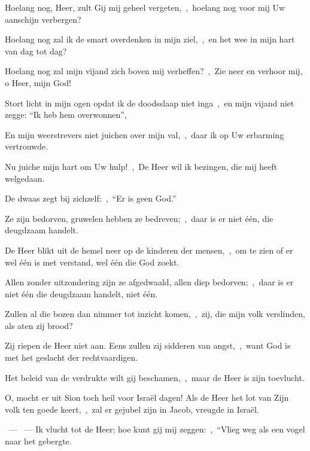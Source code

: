 \documentclass[12pt,twoside,a5paper]{article}
\begin{document}
\begin{halfparskip}
   Hoelang nog, Heer, zult Gij mij geheel vergeten,~\sep\ hoelang nog voor mij Uw aanschijn verbergen?

  Hoelang nog zal ik de smart overdenken in mijn ziel,~\sep\ en het wee in mijn hart van dag tot dag?

  Hoelang nog zal mijn vijand zich boven mij verheffen?~\sep\ Zie neer en verhoor mij, o Heer, mijn God!

  Stort licht in mijn ogen opdat ik de doodsslaap niet inga~\sep\ en mijn vijand niet zegge: ``Ik heb hem overwonnen'',

  En mijn weerstrevers niet juichen over mijn val,~\sep\ daar ik op Uw erbarming vertrouwde.

  Nu juiche mijn hart om Uw hulp!~\sep\ De Heer wil ik bezingen, die mij heeft welgedaan.
\end{halfparskip}

\begin{halfparskip}
   De dwaas zegt bij zichzelf:~\sep\ ``Er is geen God.''

  Ze zijn bedorven, gruwelen hebben ze bedreven;~\sep\ daar is er niet één, die deugdzaam handelt.

  De Heer blikt uit de hemel neer op de kinderen der mensen,~\sep\ om te zien of er wel één is met verstand, wel één die God zoekt.

  Allen zonder uitzondering zijn ze afgedwaald, allen diep bedorven;~\sep\ daar is er niet één die deugdzaam handelt, niet één.

  Zullen al die bozen dan nimmer tot inzicht komen,~\sep\ zij, die mijn volk verslinden, als aten zij brood?

  Zij riepen de Heer niet aan. Eens zullen zij sidderen van angst,~\sep\ want God is met het geslacht der rechtvaardigen.

  Het beleid van de verdrukte wilt gij beschamen,~\sep\ maar de Heer is zijn toevlucht.

  O, mocht er uit Sion toch heil voor Israël dagen! Als de Heer het lot van Zijn volk ten goede keert,~\sep\ zal er gejubel zijn in Jacob, vreugde in Israël.
\end{halfparskip}

\begin{halfparskip}
  ~--- ~---  Ik vlucht tot de Heer; hoe kunt gij mij zeggen:~\sep\ ``Vlieg weg als een vogel naar het gebergte.
\end{halfparskip}
\end{document}
